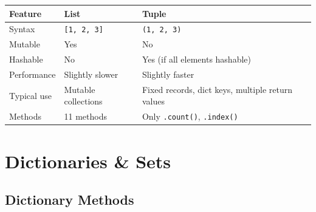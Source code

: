 \documentclass[oneside]{book}
\begin{document}
\begin{center}
\begin{tabularx}{\linewidth}{lXX}
\toprule
\textbf{Feature} & \textbf{List} & \textbf{Tuple} \\
\midrule
Syntax           & \texttt{[1, 2, 3]}   & \texttt{(1, 2, 3)} \\
Mutable          & Yes                  & No \\
Hashable         & No                   & Yes (if all elements hashable) \\
Performance      & Slightly slower      & Slightly faster \\
Typical use      & Mutable collections  & Fixed records, dict keys, multiple return values \\
Methods          & 11 methods           & Only \texttt{.count()}, \texttt{.index()} \\
\bottomrule
\end{tabularx}
\end{center}


\section{Dictionaries \& Sets}


\subsection*{Dictionary Methods}
\end{document}
